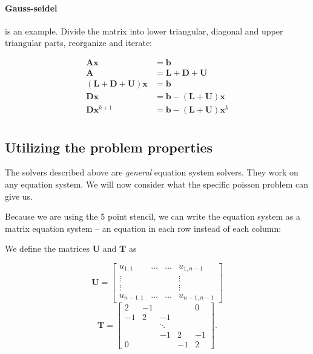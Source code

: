\paragraph*{Gauss-seidel} is an example. Divide the matrix into lower triangular, diagonal and upper triangular parts, reorganize and iterate:

\begin{align}
  \mathbf{A} \mathbf{x} &= \mathbf{b} \\
  \mathbf{A} &= \mathbf{L} + \mathbf{D} + \mathbf{U} \\
  (\mathbf{L} + \mathbf{D} + \mathbf{U}) \mathbf{x} &= \mathbf{b} \\
  \mathbf{D} \mathbf{x} &= \mathbf{b} - (\mathbf{L} + \mathbf{U}) \mathbf{x} \\
  \mathbf{D} \mathbf{x}^{k+1} &= \mathbf{b} - (\mathbf{L} + \mathbf{U}) \mathbf{x}^{k} \\
\end{align}

\subsection{Utilizing the problem properties}
The solvers described above are \emph{general} equation system solvers. They work on any equation system. We will now consider what the specific poisson problem can give us.

Because we are using the 5 point stencil, we can write the equation system as a matrix equation system -- an equation in each row instead of each column:

We define the matrices $\mathbf{U}$ and $\mathbf{T}$ as

\begin{equation}
  \mathbf{{U}} =
  \begin{bmatrix}
    u_{1,1} & \ldots & \ldots & u_{1,n-1} \\
    \vdots & & & \vdots \\
    \vdots & & & \vdots \\
    u_{n-1,1} & \ldots & \ldots & u_{n-1,n-1}
  \end{bmatrix}
\end{equation}
\begin{equation}
  \mathbf{{T}} =
  \begin{bmatrix}
    2 & -1 & & & 0 \\
    -1 & 2 & -1 & & \\
    & & \ddots & & \\
    & & -1 & 2 & -1 \\
    0 & & & -1 & 2
  \end{bmatrix}.
\end{equation}

